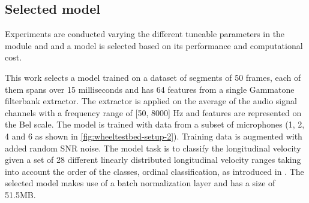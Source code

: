 \subsection{Selected model} \label{subsec:selected-model} 

Experiments are conducted varying the different tuneable parameters in the
 module and
 and a model is selected based on its
performance and computational cost.


This work selects a model trained on a dataset of segments of 50 frames, each
of them spans over 15 milliseconds and has 64 features from a single Gammatone
filterbank extractor. The extractor is applied on the average of the audio
signal channels with a frequency range of [50, 8000] Hz and features are
represented on the Bel scale. The model is trained with data from a subset of
microphones (1, 2, 4 and 6 as shown in \cref{fig:wheeltestbed-setup-2}).
Training data is augmented with added random SNR noise. The model task is to
classify the longitudinal velocity given a set of 28 different linearly
distributed longitudinal velocity ranges taking into account the order of the
classes, ordinal classification, as introduced in \cite{ordclass2006}. The
selected model makes use of a batch normalization layer and has a size of
51.5MB. 